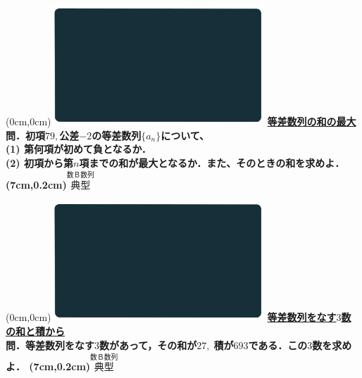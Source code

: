 \documentclass[10pt,
fleqn,
dvipdfmx,
uplatex
]{jsarticle}
\begin{document}
\newpage



\at(0cm,0cm){\includegraphics[width=8cm,bb=0 0 1920 1080]{./media_local/smart_background/数B数列.jpeg}}
{\color{orange}\bf\boldmath\Large\underline{等差数列の和の最大}}\vspace{0.3zw}\\
\large 
\bf\boldmath 問．初項${79},$公差$-2$の等差数列$\{a_n\}$について、\\
(1)  第何項が初めて負となるか．\\
(2)  初項から第$n$項までの和が最大となるか．また、そのときの和を求めよ．\\

\at(7cm,0.2cm){\small\color{bradorange}$\overset{\text{数Ｂ数列}}{\text{典型}}$}


\newpage



\at(0cm,0cm){\includegraphics[width=8cm,bb=0 0 1920 1080]{./media_local/smart_background/数B数列.jpeg}}
{\color{orange}\bf\boldmath\large\underline{等差数列をなす$3$数の和と積から}}\vspace{0.3zw}\\
\Large 
\bf\boldmath 問．等差数列をなす$3$数があって，その和が${27},\;$積が${693}$である．この$3$数を求めよ．
\at(7cm,0.2cm){\small\color{bradorange}$\overset{\text{数Ｂ数列}}{\text{典型}}$}


\newpage
\end{document}
